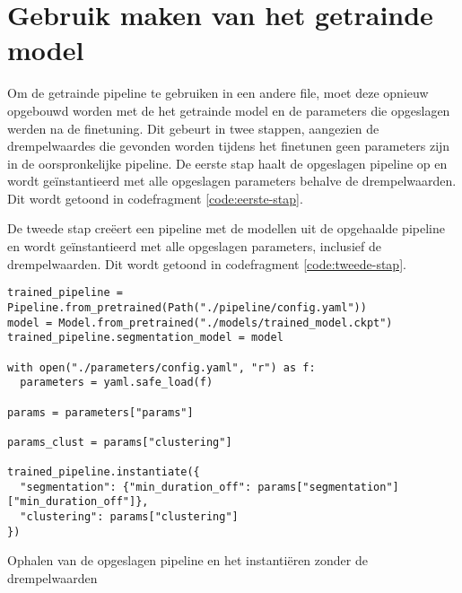 \section{Gebruik maken van het getrainde model}\label{sec:gebruik}
Om de getrainde pipeline te gebruiken in een andere file, moet deze opnieuw opgebouwd worden met de het getrainde model en de parameters die opgeslagen werden na de finetuning. Dit gebeurt in twee stappen, aangezien de drempelwaardes die gevonden worden tijdens het finetunen geen parameters zijn in de oorspronkelijke pipeline. De eerste stap haalt de opgeslagen pipeline op en wordt geïnstantieerd met alle opgeslagen parameters behalve de drempelwaarden. Dit wordt getoond in codefragment \ref{code:eerste-stap}.

De tweede stap creëert een pipeline met de modellen uit de opgehaalde pipeline en wordt geïnstantieerd met alle opgeslagen parameters, inclusief de drempelwaarden. Dit wordt getoond in codefragment \ref{code:tweede-stap}.

\begin{listing}
	\begin{verbatim}
trained_pipeline = Pipeline.from_pretrained(Path("./pipeline/config.yaml"))
model = Model.from_pretrained("./models/trained_model.ckpt")
trained_pipeline.segmentation_model = model

with open("./parameters/config.yaml", "r") as f:
  parameters = yaml.safe_load(f)

params = parameters["params"]

params_clust = params["clustering"]

trained_pipeline.instantiate({
  "segmentation": {"min_duration_off": params["segmentation"]["min_duration_off"]},
  "clustering": params["clustering"]
})
	\end{verbatim}
	\caption[Ophalen en instantiëren opgeslagen pipeline]{\label{code:eerste-stap}Ophalen van de opgeslagen pipeline en het instantiëren zonder de drempelwaarden}
\end{listing}

